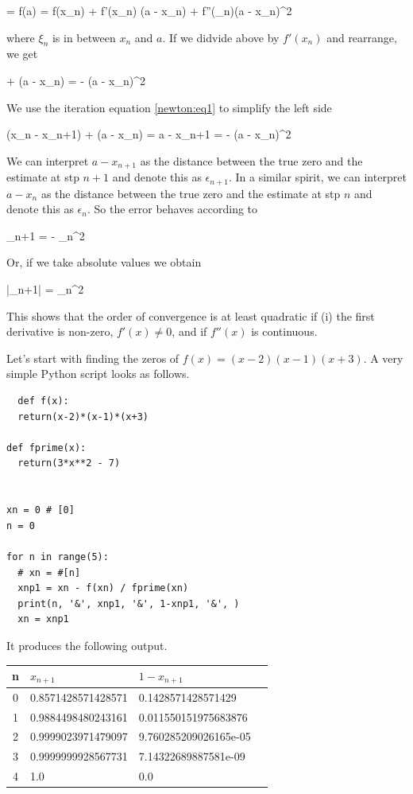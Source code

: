  = f(a) = f(x_n) + f'(x_n) (a - x_n) + f''(\xi_n)(a - x_n)^2
\eee

where $\xi_n$ is in between $x_n$ and $a$. If we didvide above by $f'(x_n)$ and rearrange, we get

\bee
{} + (a - x_n) = - (a - x_n)^2
\eee

We use the iteration equation \eqref{newton:eq1} to simplify the left side

\bee
(x_n - x_{n+1}) + (a - x_n) = a - x_{n+1} = - (a - x_n)^2
\eee

We can interpret $a - x_{n+1}$ as the distance between the true zero and the estimate at stp $n+1$ and denote this as $\epsilon_{n+1}$. In a similar spirit, we can interpret $a - x_n$ as the distance between the true zero and the estimate at stp $n$ and denote this as $\epsilon_n$. So the error behaves according to

\bee
\epsilon_{n+1} = -  \epsilon_n^2
\eee

Or, if we take absolute values we obtain

\bee
|\epsilon_{n+1}| =  \epsilon_n^2
\eee

This shows that the order of convergence is at least quadratic if (i) the first derivative is non-zero, $f'(x) \neq 0$, and if $f''(x)$ is continuous.

Let's start with finding the zeros of $f(x) = (x-2)(x-1)(x+3)$. A very simple Python script looks as follows.

\begin{verbatim}
  def f(x):
  return(x-2)*(x-1)*(x+3)

def fprime(x):
  return(3*x**2 - 7)


xn = 0 # [0]
n = 0

for n in range(5):
  # xn = #[n]
  xnp1 = xn - f(xn) / fprime(xn)
  print(n, '&', xnp1, '&', 1-xnp1, '&', )
  xn = xnp1
\end{verbatim}

It produces the following output.

\vspace*{3mm}

\begin{tabular}{c|lll} \hline
  n & $x_{n+1}$ &  $1 - x_{n+1}$ \\ \hline
  0 & 0.8571428571428571 & 0.1428571428571429 \\
  1 & 0.9884498480243161 & 0.011550151975683876 \\
  2 & 0.9999023971479097 & 9.760285209026165e-05 \\
  3 & 0.9999999928567731 & 7.14322689887581e-09 \\
  4 & 1.0 & 0.0
\end{tabular}

